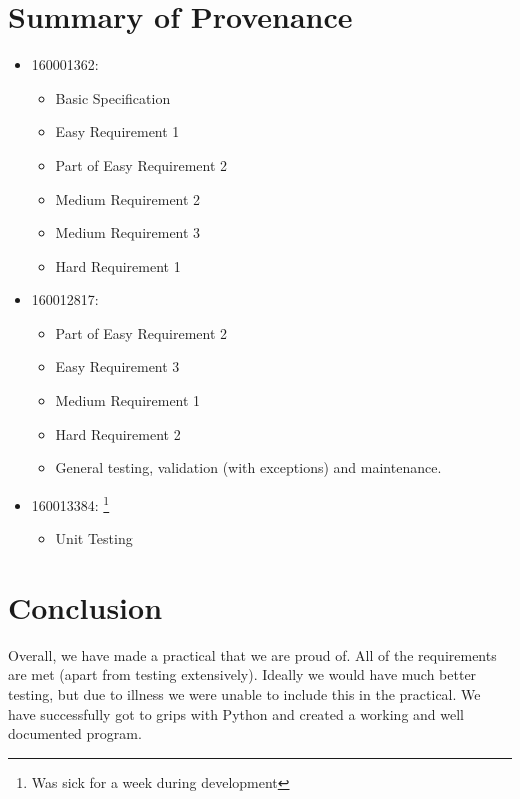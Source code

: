 \documentclass[11]{article}
\begin{document}
	\section{Summary of Provenance}
			\begin{itemize}
				\item 160001362:
					\begin{itemize}
						\item Basic Specification
						\item Easy Requirement 1
						\item Part of Easy Requirement 2
						\item Medium Requirement 2
						\item Medium Requirement 3
						\item Hard Requirement 1
					\end{itemize}
					
				\item 160012817:
					\begin{itemize}
						\item Part of Easy Requirement 2
						\item Easy Requirement 3
						\item Medium Requirement 1
						\item Hard Requirement 2
						\item General testing, validation (with exceptions) and maintenance.
					\end{itemize}
					
				\item 160013384: \footnote{Was sick for a week during development}
					\begin{itemize}
						\item Unit Testing 
					\end{itemize}
			\end{itemize}
				
	
\section{Conclusion}
	Overall, we have made a practical that we are proud of. All of the requirements are met (apart from testing extensively). Ideally we would have much better testing, but due to illness we were unable to include this in the practical. We have successfully got to grips with Python and created a working and well documented program.
\end{document}

